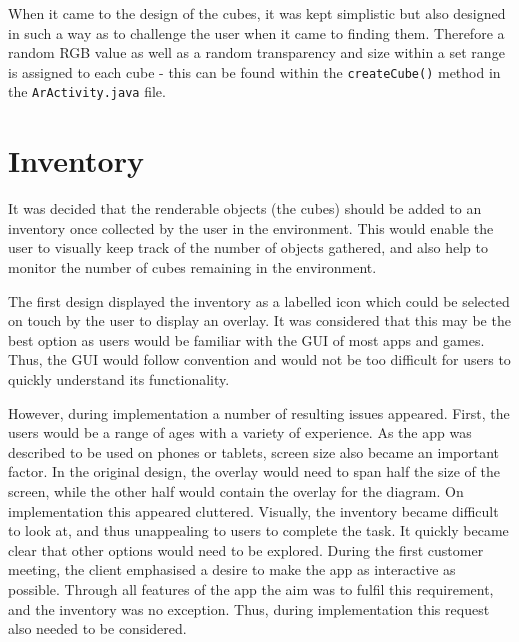 \documentclass{l3proj}
\begin{document}
When it came to the design of the cubes, it was kept simplistic but also designed in such 
a way as to challenge the user when it came to finding them. Therefore a random RGB value 
as well as a random transparency and size within a set range is assigned to each cube - this 
can be found within the \verb|createCube()| method in the \verb|ArActivity.java| file.

\section{Inventory}

It was decided that the renderable objects (the cubes) should be added to an inventory once 
collected by the user in the environment. This would enable the user to visually keep track 
of the number of objects gathered, and also help to monitor the number of cubes remaining in 
the environment.  

The first design displayed the inventory as a labelled icon which could be selected on touch 
by the user to display an overlay. It was considered that this may be the best option as users 
would be familiar with the GUI of most apps and games. Thus, the GUI would follow convention 
and would not be too difficult for users to quickly understand its functionality. 

However, during implementation a number of resulting issues appeared. First, the users would 
be a range of ages with a variety of experience. As the app was described to be used on phones 
or tablets, screen size also became an important factor.  In the original design, the overlay 
would need to span half the size of the screen, while the other half would contain the overlay 
for the diagram. On implementation this appeared cluttered. Visually, the inventory became 
difficult to look at, and thus unappealing to users to complete the task. It quickly became 
clear that other options would need to be explored. During the first customer meeting, the 
client emphasised a desire to make the app as interactive as possible. Through all features 
of the app the aim was to fulfil this requirement, and the inventory was no exception. Thus, 
during implementation this request also needed to be considered.  
\end{document}

